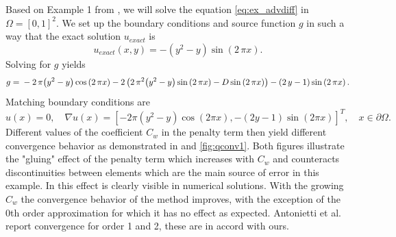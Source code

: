\begin{example}
\label{ex:quart1}
Based on Example 1 from \cite{Antonietti2013},
we will solve the equation \eqref{eq:ex_advdiff} in $\Omega = [0, 1]^2$.
We set up the boundary conditions and source function $g$ in such a way that
the exact solution $u_{exact}$ is
\begin{equation}
	u_{exact}(x,y) =  -{\left(y^{2} - y\right)} \sin\left(2 \, \pi x\right).
\end{equation}
Solving for $g$ yields
\begin{equation}
	g = \\
	 -2 \, \pi {\left(y^{2} - y\right)} \cos\left(2 \, \pi x\right) - 2 \, {\left(2 \,
	 \pi^{2}
	{\left(y^{2} - y\right)} \sin\left(2 \, \pi x\right) - D\sin\left(2 \, \pi
	x\right)\right)}
	 - {\left(2 \, y - 1\right)} \sin\left(2 \, \pi x\right).
\end{equation}
Matching boundary conditions are
\begin{equation}
u(x) = 0, \quad \nabla u(x) = [-2\pi(y^2 - y)\cos(2 \pi x), -(2 y - 1)\sin(2\pi  x)]^T,
\quad x \in \partial\Omega.
\end{equation}
Different values of the coefficient $C_w$ in the penalty term then yield different
convergence behavior as demonstrated in 
and \ref{fig:qconv1}. Both figures illustrate the "gluing" effect of the penalty term
which increases with $C_w$ and counteracts discontinuities between elements
which are the main source of error in this example. In  this effect
is clearly visible in numerical solutions. With the growing $C_w$ the convergence
behavior of the method improves, with the exception of the 0th order approximation for which it
has no effect as expected. Antonietti et al. \cite{Antonietti2013} report convergence for
order 1 and 2, these are in accord with ours.


\end{example}
